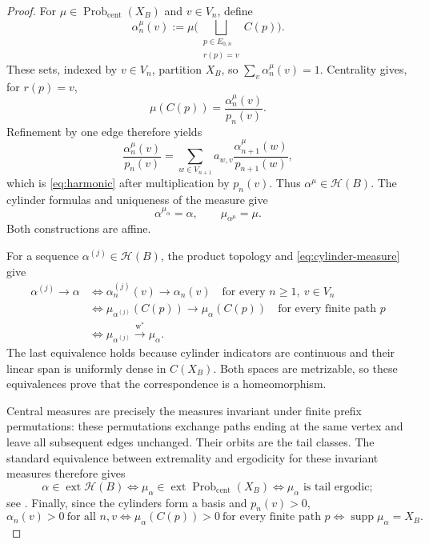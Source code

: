 \documentclass[11pt]{amsart}
\theoremstyle{definition}
\theoremstyle{remark}
\begin{document}
\begin{proof}
For $\mu\in\operatorname{Prob}_{\mathrm{cent}}(X_B)$ and $v\in V_n$, define
\begin{equation}\label{eq:harmonic-vector-from-measure}
 \alpha_n^\mu(v):=\mu\Bigg(\bigsqcup_{\substack{p\in E_{0,n}\\r(p)=v}}C(p)\Bigg).
\end{equation}
These sets, indexed by $v\in V_n$, partition $X_B$, so
$\sum_v\alpha_n^\mu(v)=1$.
Centrality gives, for $r(p)=v$,
\begin{equation}\label{eq:central-cylinder-from-tower}
 \mu(C(p))=\frac{\alpha_n^\mu(v)}{p_n(v)}.
\end{equation}
Refinement by one edge therefore yields
\[
 \frac{\alpha_n^\mu(v)}{p_n(v)}
 =\sum_{w\in V_{n+1}}a_{w,v}
   \frac{\alpha_{n+1}^\mu(w)}{p_{n+1}(w)},
\]
which is \eqref{eq:harmonic} after multiplication by $p_n(v)$.
Thus $\alpha^\mu\in\mathcal H(B)$.
The cylinder formulas and uniqueness of the measure give
\[
 \alpha^{\mu_\alpha}=\alpha,
 \qquad \mu_{\alpha^\mu}=\mu.
\]
Both constructions are affine.

For a sequence $\alpha^{(j)}\in\mathcal H(B)$, the product topology and
\eqref{eq:cylinder-measure} give
\[
 \begin{aligned}
 \alpha^{(j)}\longrightarrow\alpha
 &\iff \alpha_n^{(j)}(v)\longrightarrow\alpha_n(v)
       \quad\text{for every }n\geq1,\ v\in V_n\\
 &\iff \mu_{\alpha^{(j)}}(C(p))\longrightarrow\mu_\alpha(C(p))
       \quad\text{for every finite path }p\\
 &\iff \mu_{\alpha^{(j)}}\xrightarrow{\mathrm{w}^*}\mu_\alpha.
 \end{aligned}
\]
The last equivalence holds because cylinder indicators are continuous and
their linear span is uniformly dense in $C(X_B)$.  Both spaces are
metrizable, so these equivalences prove that the correspondence is a
homeomorphism.

Central measures are precisely the measures invariant under finite prefix
permutations: these permutations exchange paths ending at the same vertex
and leave all subsequent edges unchanged.
Their orbits are the tail classes.
The standard equivalence between extremality and ergodicity for
these invariant measures therefore gives
\[
 \alpha\in\operatorname{ext}\mathcal H(B)
 \iff \mu_\alpha\in\operatorname{ext}
       \operatorname{Prob}_{\mathrm{cent}}(X_B)
 \iff \mu_\alpha\text{ is tail ergodic};
\]
see \cite[Section~2.3]{Vershik2014}.
Finally, since the cylinders form a basis and $p_n(v)>0$,
\[
 \alpha_n(v)>0\ \text{for all }n,v
 \iff \mu_\alpha(C(p))>0\ \text{for every finite path }p
 \iff \operatorname{supp}\mu_\alpha=X_B.
\]
\end{proof}
\end{document}
